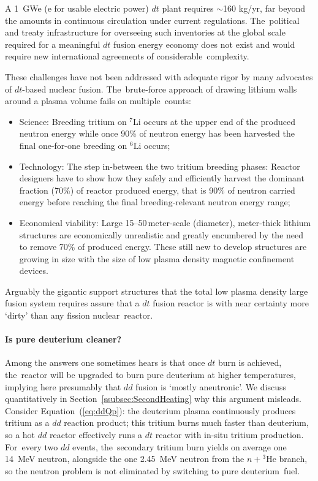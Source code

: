\documentclass[particles,article,accept,pdftex,moreauthors]{Definitions/mdpi}
\begin{document}
A 1~GWe (e for usable electric power) $dt$ plant requires $\sim$160 kg/yr, far beyond the amounts in continuous circulation under current regulations. The~political and treaty infrastructure for overseeing such inventories at the global scale required for a meaningful $dt$ fusion energy economy does not exist and would require new international agreements of considerable~complexity.

These challenges have not been addressed with adequate rigor by many advocates of $dt$-based nuclear fusion. The~brute-force approach of drawing lithium walls around a plasma volume fails on multiple~counts:
\begin{itemize}
\item Science: Breeding tritium on ${}^7\mathrm{Li}$ occurs at the upper end of the produced neutron energy while once 90\% of neutron energy has been harvested the final one-for-one breeding on ${}^6\mathrm{Li}$ occurs;
\item Technology: The step in-between the two tritium breeding phases: Reactor designers have to show how they safely and efficiently harvest the dominant fraction (70\%) of reactor produced energy, that is 90\% of neutron carried energy before reaching the final breeding-relevant neutron energy range; 
\item Economical viability: Large 15--50\,meter-scale (diameter), meter-thick lithium structures are economically unrealistic and greatly encumbered by the need to remove 70\% of produced energy. These still new to develop structures are growing in size with the size of low plasma density magnetic confinement devices. 
\end{itemize}

Arguably the gigantic support structures that the total low plasma density large fusion system requires assure that a $dt$ fusion reactor is with near certainty more `dirty' than any fission nuclear~reactor.

\vspace{-6pt}\paragraph*{\bf Is pure deuterium cleaner?}
Among the answers one sometimes hears is that once $dt$ burn is achieved, the~reactor will be upgraded to burn pure deuterium at higher temperatures, implying here presumably that $dd$ fusion is `mostly aneutronic'. We discuss quantitatively in Section~\ref{ssubsec:SecondHeating} why this argument misleads. Consider Equation~(\ref{eq:ddQp}): the deuterium plasma continuously produces tritium as a $dd$ reaction product; this tritium burns much faster than deuterium, so a hot $dd$ reactor effectively runs a $dt$ reactor with in-situ tritium production. For~every two $dd$ events, the~secondary tritium burn yields on average one 14~MeV neutron, alongside the one 2.45~MeV neutron from the $n+{}^3\mathrm{He}$ branch, so the neutron problem is not eliminated by switching to pure deuterium~fuel.
\end{document}
